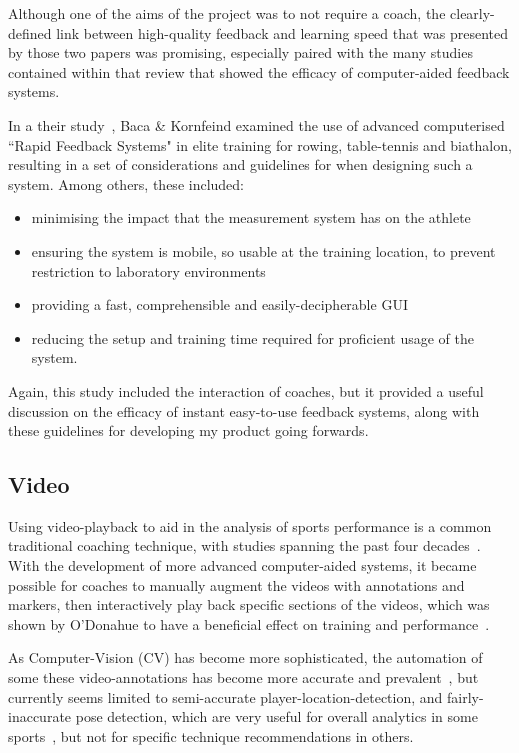 Although one of the aims of the project was to not require a coach, the clearly-defined link between high-quality feedback and learning speed that was presented by those two papers was promising, especially paired with the many studies contained within that review that showed the efficacy of computer-aided feedback systems.

In a their study~\cite{bacafeedback}, Baca \& Kornfeind examined the use of advanced computerised ``Rapid Feedback Systems" in elite training for rowing, table-tennis and biathalon, resulting in a set of considerations and guidelines for when designing such a system.
Among others, these included:
\begin{itemize}
    \item minimising the impact that the measurement system has on the athlete
    \item ensuring the system is mobile, so usable at the training location, to prevent restriction to laboratory environments
    \item providing a fast, comprehensible and easily-decipherable GUI
    \item reducing the setup and training time required for proficient usage of the system.
\end{itemize}

Again, this study included the interaction of coaches, but it provided a useful discussion on the efficacy of instant easy-to-use feedback systems, along with these guidelines for developing my product going forwards.

\subsection{Video}
Using video-playback to aid in the analysis of sports performance is a common traditional coaching technique, with studies spanning the past four decades~\cite{sportperformance86, groomcoachperceptions, groomvideo}.
With the development of more advanced computer-aided systems, it became possible for coaches to manually augment the videos with annotations and markers\cite{kinovea}, then interactively play back specific sections of the videos, which was shown by O'Donahue to have a beneficial effect on training and performance~\cite{odonovideo}.

As Computer-Vision (CV) has become more sophisticated, the automation of some these video-annotations has become more accurate and prevalent~\cite{cvinsport}, but currently seems limited to semi-accurate player-location-detection, and fairly-inaccurate pose detection, which are very useful for overall analytics in some sports~\cite{pansiottenniscv}, but not for specific technique recommendations in others.


